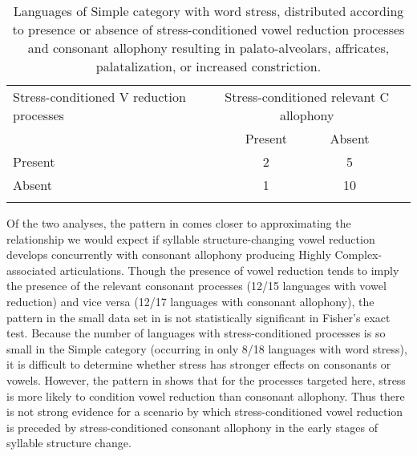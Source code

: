 \begin{table}[H]\small
\begin{tabularx}{\textwidth}{lXccX}
\lsptoprule
Stress-conditioned V reduction processes & \multicolumn{4}{c}{Stress-conditioned relevant C allophony}\\\cmidrule(lr){2-5}
 & & {Present} & {Absent}& \\\midrule
 {Present} & & 2 & 5& \\
 {Absent} & & 1 & 10& \\
\lspbottomrule
\end{tabularx}
\caption{\label{tab:7.11}Languages of Simple category with word stress, distributed according to presence or absence of stress-conditioned vowel reduction processes and consonant allophony resulting in palato-alveolars, affricates, palatalization, or increased constriction.}
\end{table}

  Of the two analyses, the pattern in  comes closer to approximating the relationship we would expect if syllable structure-changing vowel reduction develops concurrently with consonant allophony producing Highly Complex-associated articulations. Though the presence of vowel reduction tends to imply the presence of the relevant consonant processes (12/15 languages with vowel reduction) and vice versa (12/17 languages with consonant allophony), the pattern in the small data set in  is not statistically significant in Fisher’s exact test. Because the number of languages with stress-conditioned processes is so small in the Simple category (occurring in only 8/18 languages with word stress), it is difficult to determine whether stress has stronger effects on consonants or vowels. However, the pattern in  shows that for the processes targeted here, stress is more likely to condition vowel reduction than consonant allophony. Thus there is not strong evidence for a scenario by which stress-conditioned vowel reduction is preceded by stress-conditioned consonant allophony in the early stages of syllable structure change.

